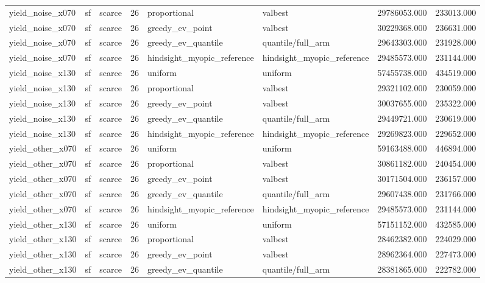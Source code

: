 \begin{tabular}{lllrllrr}
yield\_noise\_x070 & sf & scarce & 26 & proportional & valbest & 29786053.000 & 233013.000 \\
yield\_noise\_x070 & sf & scarce & 26 & greedy\_ev\_point & valbest & 30229368.000 & 236631.000 \\
yield\_noise\_x070 & sf & scarce & 26 & greedy\_ev\_quantile & quantile/full\_arm & 29643303.000 & 231928.000 \\
yield\_noise\_x070 & sf & scarce & 26 & hindsight\_myopic\_reference & hindsight\_myopic\_reference & 29485573.000 & 231144.000 \\
yield\_noise\_x130 & sf & scarce & 26 & uniform & uniform & 57455738.000 & 434519.000 \\
yield\_noise\_x130 & sf & scarce & 26 & proportional & valbest & 29321102.000 & 230059.000 \\
yield\_noise\_x130 & sf & scarce & 26 & greedy\_ev\_point & valbest & 30037655.000 & 235322.000 \\
yield\_noise\_x130 & sf & scarce & 26 & greedy\_ev\_quantile & quantile/full\_arm & 29449721.000 & 230619.000 \\
yield\_noise\_x130 & sf & scarce & 26 & hindsight\_myopic\_reference & hindsight\_myopic\_reference & 29269823.000 & 229652.000 \\
yield\_other\_x070 & sf & scarce & 26 & uniform & uniform & 59163488.000 & 446894.000 \\
yield\_other\_x070 & sf & scarce & 26 & proportional & valbest & 30861182.000 & 240454.000 \\
yield\_other\_x070 & sf & scarce & 26 & greedy\_ev\_point & valbest & 30171504.000 & 236157.000 \\
yield\_other\_x070 & sf & scarce & 26 & greedy\_ev\_quantile & quantile/full\_arm & 29607438.000 & 231766.000 \\
yield\_other\_x070 & sf & scarce & 26 & hindsight\_myopic\_reference & hindsight\_myopic\_reference & 29485573.000 & 231144.000 \\
yield\_other\_x130 & sf & scarce & 26 & uniform & uniform & 57151152.000 & 432585.000 \\
yield\_other\_x130 & sf & scarce & 26 & proportional & valbest & 28462382.000 & 224029.000 \\
yield\_other\_x130 & sf & scarce & 26 & greedy\_ev\_point & valbest & 28962364.000 & 227473.000 \\
yield\_other\_x130 & sf & scarce & 26 & greedy\_ev\_quantile & quantile/full\_arm & 28381865.000 & 222782.000 \\

\end{tabular}
